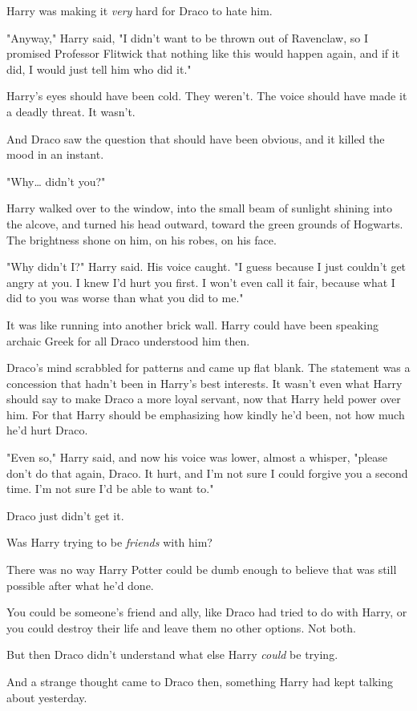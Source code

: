 Harry was making it \emph{very} hard for Draco to hate him.

"Anyway," Harry said, "I didn't want to be thrown out of Ravenclaw, so I
promised Professor Flitwick that nothing like this would happen again, and if
it did, I would just tell him who did it."

Harry's eyes should have been cold. They weren't. The voice should have made it
a deadly threat. It wasn't.

And Draco saw the question that should have been obvious, and it killed the
mood in an instant.

"Why{\ldots} didn't you?"

Harry walked over to the window, into the small beam of sunlight shining into
the alcove, and turned his head outward, toward the green grounds of Hogwarts.
The brightness shone on him, on his robes, on his face.

"Why didn't I?" Harry said. His voice caught. "I guess because I just couldn't
get angry at you. I knew I'd hurt you first. I won't even call it fair, because
what I did to you was worse than what you did to me."

It was like running into another brick wall. Harry could have been speaking
archaic Greek for all Draco understood him then.

Draco's mind scrabbled for patterns and came up flat blank. The statement was a
concession that hadn't been in Harry's best interests. It wasn't even what
Harry should say to make Draco a more loyal servant, now that Harry held power
over him. For that Harry should be emphasizing how kindly he'd been, not how
much he'd hurt Draco.

"Even so," Harry said, and now his voice was lower, almost a whisper, "please
don't do that again, Draco. It hurt, and I'm not sure I could forgive you a
second time. I'm not sure I'd be able to want to."

Draco just didn't get it.

Was Harry trying to be \emph{friends} with him?

There was no way Harry Potter could be dumb enough to believe that was still
possible after what he'd done.

You could be someone's friend and ally, like Draco had tried to do with Harry,
or you could destroy their life and leave them no other options. Not both.

But then Draco didn't understand what else Harry \emph{could} be trying.

And a strange thought came to Draco then, something Harry had kept talking
about yesterday.

